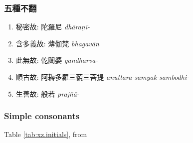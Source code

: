 \documentclass[oneside,a4paper,11pt]{article}
\newcommand{\ipa}[1]{{\phon\textit{#1}}}
\newcommand{\zh}[1]{{\cn #1}}
\newcommand{\zhc}[2]{\zh{#1} \ipa{#2}}
\begin{document}
\subsubsection{\zh{五種不翻}}

\begin{enumerate}
\item \zh{秘密故}: \zhc{陀羅尼}{dhāraṇī-}
\item \zh{含多義故}: \zhc{薄伽梵}{bhagavān}
\item \zh{此無故}: \zhc{乾闥婆}{gandharva-}
\item \zh{順古故}: \zhc{阿耨多羅三藐三菩提}{anuttara-samyak-sambodhi-}
\item \zh{生善故}: \zhc{般若}{prajñā-}
\end{enumerate}

\subsubsection{Simple consonants}
Table \ref{tab:xz.initials}, from \citet{shixd83xuanzang}
\end{document}
